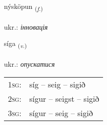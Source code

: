 \documentclass[frontgrid, backgrid]{flacards}\usepackage[]{graphicx}\usepackage[]{xcolor}
\begin{document}
\renewcommand{\flhead}{\vskip5pt \fboxsep=0pt {\small\bfseries\footnotesize Nafnorð | іменник}}
\renewcommand{\fcfoot}{\vskip5pt \fboxsep=0pt \hspace{2pt}{\small\bfseries\footnotesize 3K}}

\renewcommand{\blhead}{\vskip5pt {\small\bfseries\footnotesize Nafnorð | іменник }}
\renewcommand{\bcfoot}{\vskip5pt \hspace{2pt}{\small\bfseries\footnotesize 3K}}


{nýsköpun \small{\textsubscript{(\textit{f.})}} \\[1ex] %
\textphonetic{[niːskœpʏn]} \\
ukr.: \emph{інновація} \\  [2ex]
\renewcommand*{\arraystretch}{0.8}
}

\renewcommand{\flhead}{\vskip5pt \fboxsep=0pt {\small\bfseries\footnotesize Sagnorð | дієслово}}
\renewcommand{\fcfoot}{\vskip5pt \fboxsep=0pt \hspace{2pt}{\small\bfseries\footnotesize 3K}}

\renewcommand{\blhead}{\vskip5pt {\small\bfseries\footnotesize Sagnorð | дієслово }}
\renewcommand{\bcfoot}{\vskip5pt \hspace{2pt}{\small\bfseries\footnotesize 3K}}


{síga \small{\textsubscript{(\textit{v.})}} \\[1ex] %
\textphonetic{[siːɣa]} \\
ukr.: \emph{опускатися} \\  [2ex]
\renewcommand*{\arraystretch}{0.8}
\begin{tabular}{p{1cm}l}
\textsc{1sg}: & síg -- seig -- sigið \\ 
\textsc{2sg}: & sígur -- seigst -- sigið \\ 
\textsc{3sg}: & sígur -- seig -- sigið \\ 
\end{tabular}
}
\end{document}
